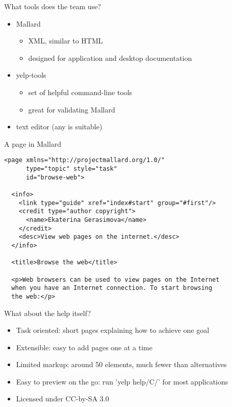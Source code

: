 \documentclass{beamer}
\begin{document}
\begin{frame}
\end{frame}

\begin{frame}{What tools does the team use?}
  \begin{itemize}
  \item
    Mallard
    \begin{itemize}
      \item
        XML, similar to HTML
      \item
        designed for application and desktop documentation
    \end{itemize}
  \item
    yelp-tools
    \begin{itemize}
      \item
        set of helpful command-line tools
      \item
 	great for validating Mallard
    \end{itemize}
  \item
    text editor (any is suitable)
  \end{itemize}
\end{frame}

\begin{frame}{A page in Mallard}
  \begin{lstlisting}
<page xmlns="http://projectmallard.org/1.0/"
      type="topic" style="task"
      id="browse-web">

  <info>
    <link type="guide" xref="index#start" group="#first"/>
    <credit type="author copyright">
      <name>Ekaterina Gerasimova</name>
    </credit>
    <desc>View web pages on the internet.</desc>
  </info>

  <title>Browse the web</title>

  <p>Web browsers can be used to view pages on the Internet
  when you have an Internet connection. To start browsing
  the web:</p>
  \end{lstlisting}
\end{frame}

\begin{frame}{What about the help itself?}
  \begin{itemize}
  \item
    Task oriented: short pages explaining how to achieve one goal
  \item
    Extensible: easy to add pages one at a time
  \item
    Limited markup: around 50 elements, much fewer than alternatives
  \item
    Easy to preview on the go: run 'yelp help/C/' for most applications
  \item
    Licensed under CC-by-SA 3.0
  \end{itemize}
\end{frame}
\end{document}
